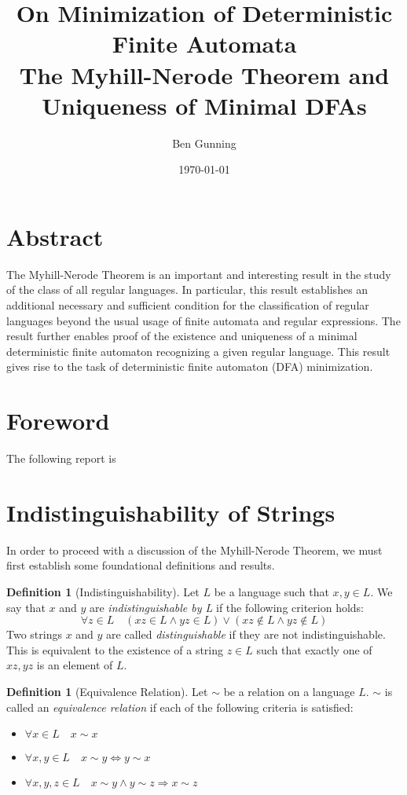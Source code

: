 \documentclass[12pt]{article}
\title{\textbf{\Large{On Minimization of Deterministic Finite Automata}} \\ \large{\textbf{The Myhill-Nerode Theorem and Uniqueness of Minimal DFAs}}}
\author{Ben Gunning}
\date{\today}
\theoremstyle{definition}
\newtheorem{definition}[theorem]{Definition}
\theoremstyle{remark}
\begin{document}
\maketitle



\section*{Abstract}
The Myhill-Nerode Theorem is an important and interesting result in the study of the class of all regular languages. In particular, this result establishes an additional necessary and sufficient condition for the classification of regular languages beyond the usual usage of finite automata and regular expressions.
The result further enables proof of the existence and uniqueness of a minimal deterministic finite automaton recognizing a given regular language. This result gives rise to the task of deterministic finite automaton (DFA) minimization.

\section*{Foreword}
The following report is 

\section{Indistinguishability of Strings}

In order to proceed with a discussion of the Myhill-Nerode Theorem, we must first establish some foundational definitions and results.

\begin{definition}[Indistinguishability]
Let $L$ be a language such that $x,y \in L$. We say that $x$ and $y$ are \emph{indistinguishable by L} if the following criterion holds:
\[ \forall z \in L \quad (xz \in L \wedge yz \in L) \vee (xz \notin L \wedge yz \notin L) \]
Two strings $x$ and $y$ are called \emph{distinguishable} if they are not indistinguishable. This is equivalent to the existence of a string $z \in L$ such that exactly one of $xz,yz$ is an element of $L$.
\end{definition}

\begin{definition}[Equivalence Relation]
Let $\sim$ be a relation on a language $L$. $\sim$ is called an \emph{equivalence relation} if each of the following criteria is satisfied:
\begin{itemize}
	\item{$\forall x \in L \quad x \sim x$}
	\item{$\forall x,y \in L \quad x \sim y \Leftrightarrow y \sim x$}
	\item{$\forall x,y,z \in L \quad x \sim y \wedge y \sim z \Rightarrow x \sim z$}
\end{itemize}
\end{definition}
\end{document}
